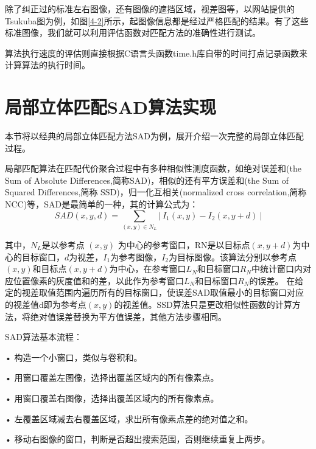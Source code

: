 除了纠正过的标准左右图像，还有图像的遮挡区域，视差图等，以网站提供的Tsukuba图为例，如图\ref{4-2}所示，起图像信息都是经过严格匹配的结果。有了这些标准图像，我们就可以利用评估函数对匹配方法的准确性进行测试。


算法执行速度的评估则直接根据C语言头函数time.h库自带的时间打点记录函数来计算算法的执行时间。

\section{局部立体匹配SAD算法实现}

本节将以经典的局部立体匹配方法SAD为例，展开介绍一次完整的局部立体匹配过程。


局部匹配算法在匹配代价聚合过程中有多种相似性测度函数，如绝对误差和(the Sum of Absolute Differences,简称SAD)，相似的还有平方误差和(the Sum of Squared Differences,简称 SSD)，归一化互相关(normalized cross correlation,简称 NCC)等，SAD是最简单的一种，其的计算公式为：
\begin{equation}
SAD(x,y,d)=\sum_{(x,y)\in N_{L}} |\ I_{1}(x,y)-I_{2}(x,y+d) \ |
\end{equation}

其中，$N_{L}$是以参考点 $(x,y)$ 为中心的参考窗口，RN是以目标点$(x,y+d)$为中心的目标窗口，$d$为视差，$I_{1}$为参考图像，$I_{2}$为目标图像。该算法分别以参考点$(x,y)$和目标点$(x,y+d)$为中心，在参考窗口$L_{N}$和目标窗口$R_{N}$中统计窗口内对应位置像素的灰度值和的差，以此作为参考窗口$L_{N}$和目标窗口$R_{N}$的误差。
在给定的视差取值范围内遍历所有的目标窗口，使误差SAD取值最小的目标窗口对应的视差值d即为参考点$(x,y)$的视差值。SSD算法只是更改相似性函数的计算方法，将绝对值误差替换为平方值误差，其他方法步骤相同。


SAD算法基本流程：

•  构造一个小窗口，类似与卷积和。

•  用窗口覆盖左图像，选择出覆盖区域内的所有像素点。 

•  用窗口覆盖右图像，选择出覆盖区域内的所有像素点。

•  左覆盖区域减去右覆盖区域，求出所有像素点差的绝对值之和。

•  移动右图像的窗口，判断是否超出搜索范围，否则继续重复上两步。

